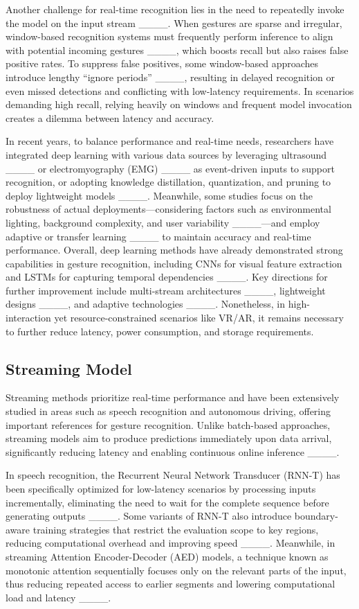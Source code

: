 Another challenge for real-time recognition lies in the need to repeatedly invoke the model on the input stream ____. When gestures are sparse and irregular, window-based recognition systems must frequently perform inference to align with potential incoming gestures ____, which boosts recall but also raises false positive rates. To suppress false positives, some window-based approaches introduce lengthy “ignore periods” ____, resulting in delayed recognition or even missed detections and conflicting with low-latency requirements. In scenarios demanding high recall, relying heavily on windows and frequent model invocation creates a dilemma between latency and accuracy.

In recent years, to balance performance and real-time needs, researchers have integrated deep learning with various data sources by leveraging ultrasound ____ or electromyography (EMG) ____ as event-driven inputs to support recognition, or adopting knowledge distillation, quantization, and pruning to deploy lightweight models ____. Meanwhile, some studies focus on the robustness of actual deployments—considering factors such as environmental lighting, background complexity, and user variability ____—and employ adaptive or transfer learning ____ to maintain accuracy and real-time performance. Overall, deep learning methods have already demonstrated strong capabilities in gesture recognition, including CNNs for visual feature extraction and LSTMs for capturing temporal dependencies ____. Key directions for further improvement include multi-stream architectures ____, lightweight designs ____, and adaptive technologies ____. Nonetheless, in high-interaction yet resource-constrained scenarios like VR/AR, it remains necessary to further reduce latency, power consumption, and storage requirements.

\subsection{Streaming Model}

Streaming methods prioritize real-time performance and have been extensively studied in areas such as speech recognition and autonomous driving, offering important references for gesture recognition. Unlike batch-based approaches, streaming models aim to produce predictions immediately upon data arrival, significantly reducing latency and enabling continuous online inference ____.

In speech recognition, the Recurrent Neural Network Transducer (RNN-T) has been specifically optimized for low-latency scenarios by processing inputs incrementally, eliminating the need to wait for the complete sequence before generating outputs ____. Some variants of RNN-T also introduce boundary-aware training strategies that restrict the evaluation scope to key regions, reducing computational overhead and improving speed ____. Meanwhile, in streaming Attention Encoder-Decoder (AED) models, a technique known as monotonic attention sequentially focuses only on the relevant parts of the input, thus reducing repeated access to earlier segments and lowering computational load and latency ____.

